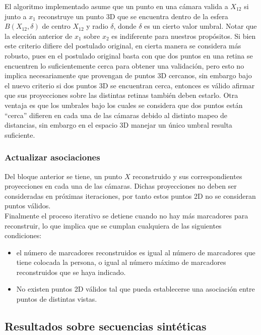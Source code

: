 El algoritmo implementado asume que un punto en una cámara valida a $X_{12}$ si junto a $x_1$ reconstruye un punto 3D que se encuentra dentro de la esfera $B(X_{12}, \delta)$ de centro $X_{12}$ y radio $\delta$, donde $\delta$ es un cierto valor umbral. Notar que la elección anterior de $x_1$ sobre $x_2$ es indiferente para nuestros propósitos. Si bien este criterio difiere del postulado original, en cierta manera se considera más robusto, pues en el postulado original basta con que dos puntos en una retina se encuentren lo suficientemente cerca para obtener una validación, pero esto no implica necesariamente que provengan de puntos 3D cercanos, sin embargo bajo el nuevo criterio si dos puntos 3D se encuentran cerca, entonces es válido afirmar que sus proyecciones sobre las distintas retinas también deben estarlo. Otra ventaja es que los umbrales bajo los cuales se considera que dos puntos están ``cerca'' difieren en cada una de las cámaras debido al distinto mapeo de distancias, sin embargo en el espacio 3D manejar un único umbral resulta suficiente.       

\subsubsection{Actualizar asociaciones}\label{actualizar_asociaciones}

Del bloque anterior se tiene, un punto $X$ reconstruido y sus correspondientes proyecciones en cada una de las cámaras. Dichas proyecciones no deben ser consideradas en próximas iteraciones, por tanto estos puntos 2D no se consideran puntos válidos.\\



Finalmente el proceso iterativo se detiene cuando no hay más marcadores para reconstruir, lo que implica que se cumplan cualquiera de las siguientes condiciones:\\
\begin{itemize}
\item el número de marcadores reconstruidos es igual al número de marcadores que tiene colocada la persona, o igual al número máximo de marcadores  reconstruidos que se haya indicado.

\item No existen puntos 2D válidos tal que pueda establecerse una asociación entre puntos de distintas vistas.
\end{itemize}




\subsection{Resultados sobre secuencias sintéticas}

